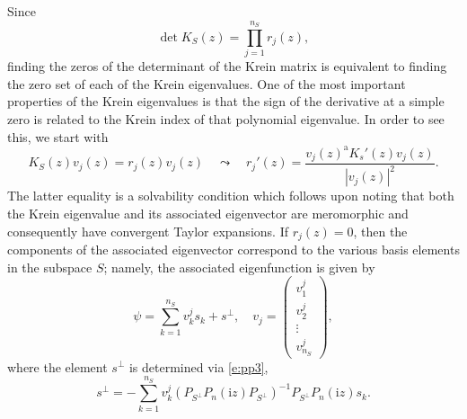 \documentclass[review,onefignum,onetabnum]{siamart171218}
\def\det{\mathop\mathrm{det}\nolimits}
\newcommand{\rma}{\mathrm{a}}
\newcommand{\rmi}{\mathrm{i}}
\newcommand{\vK}{\bm{\mathit{K}}}
\newcommand{\vv}{\bm{\mathit{v}}}
\begin{document}
Since
\[
\det\vK_S(z)=\prod_{j=1}^{n_S}r_j(z),
\]
finding the zeros of the determinant of the Krein matrix is equivalent to
finding the zero set of each of the Krein eigenvalues.
One of the most important properties of the Krein eigenvalues is that the
sign of the derivative at a simple zero is related to the Krein index of that
polynomial eigenvalue. In order to see this, we start with
\begin{equation}\label{e:31a}
\vK_S(z)\vv_j(z)=r_j(z)\vv_j(z)\quad\leadsto\quad
r_j'(z)=\frac{\vv_j(z)^\rma\vK_s'(z)\vv_j(z)}{|\vv_j(z)|^2}.
\end{equation}
The latter equality is a solvability condition which follows upon noting that
both the Krein eigenvalue and its associated eigenvector are meromorphic and
consequently have convergent Taylor expansions. If $r_j(z)=0$, then the
components of the associated eigenvector correspond to the various basis
elements in the subspace $S$; namely, the associated eigenfunction is given
by
\begin{equation}\label{e:31}
\psi=\sum_{k=1}^{n_S}v^j_ks_k+s^\perp,\quad
\vv_j=\left(\begin{array}{c}v^j_1\\v^j_2\\\vdots\\v^j_{n_S}\end{array}\right),
\end{equation}
where the element $s^\perp$ is determined via \cref{e:pp3},
\[
s^\perp=-\sum_{k=1}^{n_S}v^j_k\left(P_{S^\perp}P_n(\rmi z)P_{S^\perp}\right)^{-1}P_{S^\perp}P_n(\rmi z)s_k.
\]
\end{document}
